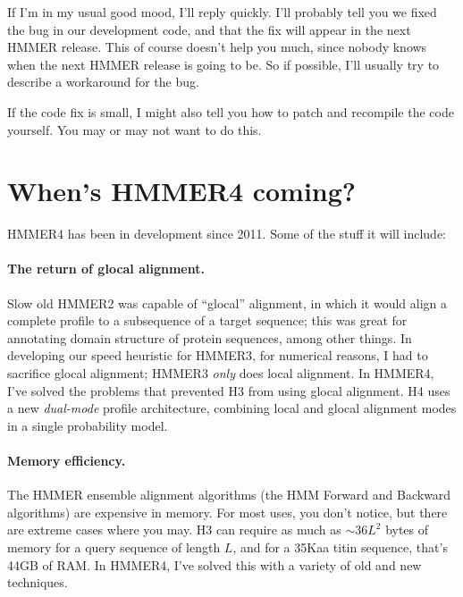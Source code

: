 If I'm in my usual good mood, I'll reply quickly.  I'll probably
tell you we fixed the bug in our development code, and that the fix
will appear in the next HMMER release. This of course doesn't help you
much, since nobody knows when the next HMMER release is going to be.
So if possible, I'll usually try to describe a workaround for the
bug.

If the code fix is small, I might also tell you how to patch and
recompile the code yourself. You may or may not want to do this.






\section{When's HMMER4 coming?}

HMMER4 has been in development since 2011. Some of the stuff it will include:

\paragraph{The return of glocal alignment.} Slow old HMMER2 was
 capable of ``glocal'' alignment, in which it would align a complete
 profile to a subsequence of a target sequence; this was great for
 annotating domain structure of protein sequences, among other things.
 In developing our speed heuristic for HMMER3, for numerical reasons,
 I had to sacrifice glocal alignment; HMMER3 \emph{only} does local
alignment. In HMMER4, I've solved the problems that prevented H3 from
using glocal alignment. H4 uses a new \emph{dual-mode} profile
architecture, combining local and glocal alignment modes in a single
probability model.

\paragraph{Memory efficiency.} The HMMER ensemble alignment
algorithms (the HMM Forward and Backward algorithms) are expensive in
memory. For most uses, you don't notice, but there are extreme cases
where you may. H3 can require as much as $\sim 36L^2$ bytes of memory
for a query sequence of length $L$, and for a 35Kaa titin sequence,
that's 44GB of RAM. In HMMER4, I've solved this with a variety of old
and new techniques.

